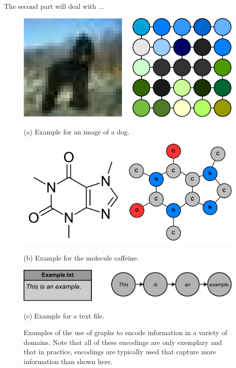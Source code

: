 The second part will deal with ...
\begin{figure}[H]
    \centering
    \begin{minipage}[b]{0.475\textwidth}
        \centering
        \includegraphics[width=\textwidth]{Figures/Example_Encoding_Image.pdf}
        \caption*{(a) Example for an image of a dog.\footnotemark}
    \end{minipage}
    \hfill
    \begin{minipage}[b]{0.475\textwidth}
        \centering
        \includegraphics[width=\textwidth]{Figures/Example_Encoding_Molecule.pdf}
        \caption*{(b) Example for the molecule caffeine.}
    \end{minipage}
    \par\medskip
    \centering
    \includegraphics[scale=.5]{Figures/Example_Encoding_Text.pdf}
    \caption*{(c) Example for a text file.}
    \hfill

    \caption[Caption for LOF]{Examples of the use of graphs to encode information in a variety of domains. Note that all of these encodings are only exemplary and that in practice, encodings are typically used that capture more information than shown here.\footnotemark}
    \label{fig:example_encodings}
\end{figure}



\newpage